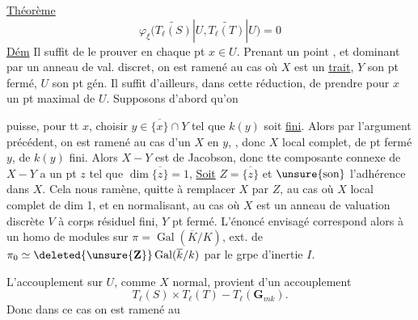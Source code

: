 \uline{Théorème}
\[
\varphi_\xi\bigl(\widetilde{T_\ell(S)}|U,\widetilde{T_\ell(T)}|U\bigr)=0
\]
\uline{Dém} Il suffit de le prouver en chaque pt $x\in U$.
Prenant un point  , et dominant par un anneau de val. discret, on est ramené au cas où $X$ est un \uline{trait}, $Y$ son pt fermé, $U$ son pt gén. Il suffit d'ailleurs, dans cette réduction, de prendre pour $x$ un pt maximal de $U$. Supposons  d'abord qu'on

puisse, pour tt $x$, choisir $y\in\overline{\{x\}}\cap Y$ tel que $k(y)$ soit \uline{fini}.  Alors par l'argument précédent, on est ramené au cas d'un   $X$ en $y$, , donc $X$ local complet, de pt fermé $y$, de $k(y)$ fini. Alors $X-Y$ est de Jacobson, donc tte composante connexe de $X-Y$ a un pt $z$ tel que $\dim\overline{\{z\}}=1$, \uline{Soit} $Z=\overline{\{z\}}$ et $\unsure{\text{son}}$ l'adhérence dans $X$. Cela nous ramène,  quitte à remplacer $X$ par $Z$, au cas où $X$ local complet de dim 1, et en normalisant, au cas où $X$ est  un anneau de valuation discrète $V$ à corps résiduel fini, $Y$ pt fermé. L'énoncé envisagé correspond alors à un homo de modules sur $\pi=\operatorname{Gal}(\overline K/K)$, ext. de $\pi_0\simeq\deleted{\unsure{\mathbf Z}}\operatorname{Gal}(\overline k/k)$  par le grpe d'inertie $I$.

L'accouplement sur $U$, comme $X$ normal, provient d'un accouplement
\[
T_\ell(S)\times T_\ell(T)\mathbin{-}T_\ell(\mathbf G_{mk}).
\]
Donc dans ce cas on est ramené au

